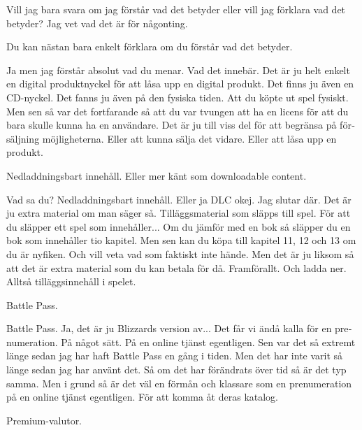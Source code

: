 \documentclass[11p]{article}
\begin{document}
\begin{otherlanguage}{swedish}
        \setlength{\leftskip}{1cm}

        Vill jag bara svara om jag förstår vad det betyder eller vill jag förklara vad det betyder? Jag vet vad det är för någonting.

        \setlength{\leftskip}{0cm}
        Du kan nästan bara enkelt förklara om du förstår vad det betyder.

        \setlength{\leftskip}{1cm}

        Ja men jag förstår absolut vad du menar. Vad det innebär.
        Det är ju helt enkelt en digital produktnyckel för att låsa upp en digital produkt. Det finns ju även en CD-nyckel. Det fanns ju även på den fysiska tiden. Att du köpte ut spel fysiskt.
        Men sen så var det fortfarande så att du var tvungen att ha en licens för att du bara skulle kunna ha en användare. Det är ju till viss del för att begränsa på försäljning möjligheterna. Eller att kunna sälja det vidare. Eller att låsa upp en produkt.


        \setlength{\leftskip}{0cm}
        Nedladdningsbart innehåll. Eller mer känt som downloadable content.

        \setlength{\leftskip}{1cm}

        Vad sa du? Nedladdningsbart innehåll. Eller ja DLC okej. Jag slutar där. Det är ju extra material om man säger så.
        Tilläggsmaterial som släpps till spel. För att du släpper ett spel som innehåller... Om du jämför med en bok så släpper du en bok som innehåller tio kapitel.
        Men sen kan du köpa till kapitel 11, 12 och 13 om du är nyfiken. Och vill veta vad som faktiskt inte hände. Men det är ju liksom så att det är extra material som du kan betala för då. Framförallt. Och ladda ner. Alltså tilläggsinnehåll i spelet.


        \setlength{\leftskip}{0cm}
        Battle Pass.

        \setlength{\leftskip}{1cm}

        Battle Pass. Ja, det är ju Blizzards version av... Det får vi ändå kalla för en prenumeration. På något sätt.
        På en online tjänst egentligen. Sen var det så extremt länge sedan jag har haft Battle Pass en gång i tiden. Men det har inte varit så länge sedan jag har använt det.
        Så om det har förändrats över tid så är det typ samma. Men i grund så är det väl en förmån och klassare som en prenumeration på en online tjänst egentligen. För att komma åt deras katalog.


        \setlength{\leftskip}{0cm}
        Premium-valutor.


\end{otherlanguage}
\end{document}
